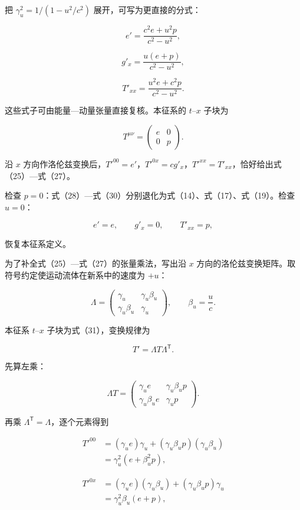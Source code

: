 \documentclass[12pt,a4paper,UTF8]{ctexart}
\begin{document}
把 \(\gamma_u^2=1/(1-u^2/c^2)\) 展开，可写为更直接的分式：

\[
\boxed{
e'=\frac{c^2e+u^2p}{c^2-u^2}
}, \tag{28}
\]

\[
\boxed{
g'_x=\frac{u(e+p)}{c^2-u^2}
}, \tag{29}
\]

\[
\boxed{
T'_{xx}=\frac{u^2e+c^2p}{c^2-u^2}
}. \tag{30}
\]

这些式子可由能量---动量张量直接复核。本征系的 \(t\)--\(x\) 子块为

\[
T^{\mu\nu}
=\begin{pmatrix}
e&0\\
0&p
\end{pmatrix}. \tag{31}
\]

沿 \(x\)
方向作洛伦兹变换后，\(T'^{00}=e'\)，\(T'^{0x}=cg'_x\)，\(T'^{xx}=T'_{xx}\)，恰好给出式（25）---式（27）。

检查
\(p=0\)：式（28）---式（30）分别退化为式（14）、式（17）、式（19）。检查
\(u=0\)：

\[
e'=e,\qquad g'_x=0,\qquad T'_{xx}=p, \tag{32}
\]

恢复本征系定义。

为了补全式（25）---式（27）的张量乘法，写出沿 \(x\)
方向的洛伦兹变换矩阵。取符号约定使运动流体在新系中的速度为 \(+u\)：

\[
\Lambda=
\begin{pmatrix}
\gamma_u&\gamma_u\beta_u\\
\gamma_u\beta_u&\gamma_u
\end{pmatrix},
\qquad
\beta_u=\frac uc. \tag{33}
\]

本征系 \(t\)--\(x\) 子块为式（31），变换规律为

\[
T'=\Lambda T\Lambda^{\mathsf T}. \tag{34}
\]

先算左乘：

\[
\Lambda T
=
\begin{pmatrix}
\gamma_u e&\gamma_u\beta_u p\\
\gamma_u\beta_u e&\gamma_u p
\end{pmatrix}. \tag{35}
\]

再乘 \(\Lambda^{\mathsf T}=\Lambda\)，逐个元素得到

\[
\begin{aligned}
T'^{00}
&=(\gamma_u e)\gamma_u
+(\gamma_u\beta_u p)(\gamma_u\beta_u)\\
&=\gamma_u^2(e+\beta_u^2p),
\end{aligned} \tag{36}
\]

\[
\begin{aligned}
T'^{0x}
&=(\gamma_u e)(\gamma_u\beta_u)
+(\gamma_u\beta_u p)\gamma_u\\
&=\gamma_u^2\beta_u(e+p),
\end{aligned} \tag{37}
\]
\end{document}
